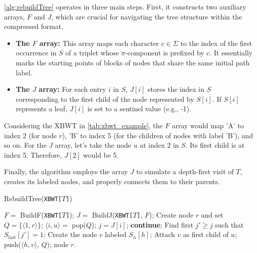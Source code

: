 \cref{alg:rebuildTree} operates in three main steps. First, it constructs two auxiliary arrays, $F$ and $J$, which are crucial for navigating the tree structure within the compressed format.

\begin{itemize}
    \item \textbf{The $F$ array:} This array maps each character $c \in \Sigma$ to the index of the first occurrence in $S$ of a triplet whose $\pi$-component is prefixed by $c$. It essentially marks the starting points of blocks of nodes that share the same initial path label.
    \item \textbf{The $J$ array:} For each entry $i$ in $S$, $J[i]$ stores the index in $S$ corresponding to the first child of the node represented by $S[i]$. If $S[i]$ represents a leaf, $J[i]$ is set to a sentinel value (e.g., -1).
\end{itemize}

\begin{example}
    Considering the XBWT in \cref{tab:xbwt_example}, the $F$ array would map 'A' to index 2 (for node $r$), 'B' to index 5 (for the children of nodes with label 'B'), and so on. For the $J$ array, let's take the node $u$ at index 2 in $S$. Its first child is at index 5. Therefore, $J[2]$ would be 5.
\end{example}

Finally, the algorithm employs the array $J$ to
simulate a depth-first visit of $T$, creates its labeled nodes, and properly connects them to their parents. 

\begin{algorithm}[H]
    \caption{RebuildTree(\texttt{XBWT[$T$]})}
    \label{alg:rebuildTree}
    \begin{algorithmic}[1]
    \State $F = $ BuildF(\texttt{XBWT[$T$]});
    \State $J = $ BuildJ(\texttt{XBWT[$T$]}, $F$); 
    \State Create node $r$ and set $Q = \{\langle1, r\rangle\}$; 
     
        \State $\langle i, u \rangle = $ pop($Q$);
        \State $j = J[i]$; 
         
            \State \textbf{continue};
        \EndIf
        \State Find first $j' \geq j$ such that $S_{\text{last}}[j'] = 1$; 
            \State Create the node $v$ labeled $S_\alpha[h]$;
            \State Attach $v$ as first child of $u$;
            \State push($\langle h, v \rangle$, $Q$);
        \EndFor
    \EndWhile
    \State \Return node $r$.
    \end{algorithmic}
\end{algorithm}

